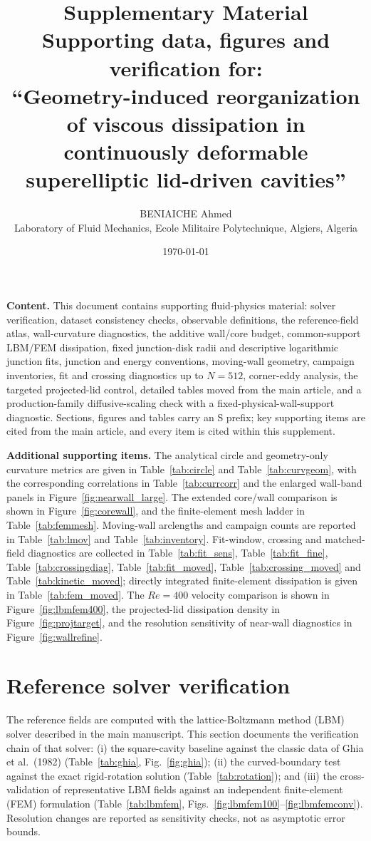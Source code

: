 \documentclass[11pt]{article}
\title{\bfseries Supplementary Material\\[6pt]
\large Supporting data, figures and verification for:\\
``Geometry-induced reorganization of viscous dissipation in continuously deformable superelliptic lid-driven cavities''}
\author{BENIAICHE Ahmed\\[2pt]
\small Laboratory of Fluid Mechanics, Ecole Militaire Polytechnique, Algiers, Algeria}
\date{\today}
\begin{document}
\maketitle

\noindent\textbf{Content.} This document contains supporting fluid-physics material: solver verification, dataset consistency checks, observable definitions, the reference-field atlas, wall-curvature diagnostics, the additive wall/core budget, common-support LBM/FEM dissipation, fixed junction-disk radii and descriptive logarithmic junction fits, junction and energy conventions, moving-wall geometry, campaign inventories, fit and crossing diagnostics up to $N=512$, corner-eddy analysis, the targeted projected-lid control, detailed tables moved from the main article, and a production-family diffusive-scaling check with a fixed-physical-wall-support diagnostic. Sections, figures and tables carry an S prefix; key supporting items are cited from the main article, and every item is cited within this supplement.

\noindent\textbf{Additional supporting items.} The analytical circle and geometry-only curvature metrics are given in Table~\ref{tab:circle} and Table~\ref{tab:curvgeom}, with the corresponding correlations in Table~\ref{tab:currcorr} and the enlarged wall-band panels in Figure~\ref{fig:nearwall_large}. The extended core/wall comparison is shown in Figure~\ref{fig:corewall}, and the finite-element mesh ladder in Table~\ref{tab:femmesh}. Moving-wall arclengths and campaign counts are reported in Table~\ref{tab:lmov} and Table~\ref{tab:inventory}. Fit-window, crossing and matched-field diagnostics are collected in Table~\ref{tab:fit_sens}, Table~\ref{tab:fit_fine}, Table~\ref{tab:crossingdiag}, Table~\ref{tab:fit_moved}, Table~\ref{tab:crossing_moved} and Table~\ref{tab:kinetic_moved}; directly integrated finite-element dissipation is given in Table~\ref{tab:fem_moved}. The $Re=400$ velocity comparison is shown in Figure~\ref{fig:lbmfem400}, the projected-lid dissipation density in Figure~\ref{fig:projtarget}, and the resolution sensitivity of near-wall diagnostics in Figure~\ref{fig:wallrefine}.

\section{Reference solver verification}\label{sec:solver}
The reference fields are computed with the lattice-Boltzmann
method (LBM) solver described in the main manuscript. This section documents
the verification chain of that solver: (i) the square-cavity baseline against the
classic data of Ghia et al.\ (1982) (Table~\ref{tab:ghia}, Fig.~\ref{fig:ghia});
(ii) the curved-boundary test against the exact rigid-rotation solution
(Table~\ref{tab:rotation}); and (iii) the cross-validation of representative LBM
fields against an independent finite-element (FEM) formulation
(Table~\ref{tab:lbmfem}, Figs.~\ref{fig:lbmfem100}--\ref{fig:lbmfemconv}).
Resolution changes are reported as sensitivity checks, not as asymptotic error
bounds.
\end{document}
